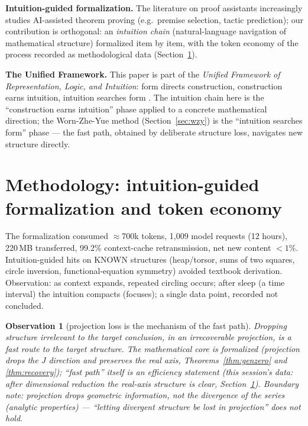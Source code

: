 \documentclass[11pt]{article}
\newtheorem{observation}{Observation}
\theoremstyle{remark}
\begin{document}
\textbf{Intuition-guided formalization.} The literature on proof assistants
increasingly studies AI-assisted theorem proving (e.g.\ premise selection,
tactic prediction); our contribution is orthogonal: an \emph{intuition chain}
(natural-language navigation of mathematical structure) formalized item by
item, with the token economy of the process recorded as methodological data
(Section~\ref{sec:methodology}).

\textbf{The Unified Framework.} This paper is part of the \emph{Unified
Framework of Representation, Logic, and Intuition}: form directs
construction, construction earns intuition, intuition searches form
\cite{uf-manifesto}. The intuition chain here is the ``construction earns
intuition'' phase applied to a concrete mathematical direction; the
Worn-Zhe-Yue method (Section~\ref{sec:wzy}) is the ``intuition searches
form'' phase --- the fast path, obtained by deliberate structure loss,
navigates new structure directly.

\section{Methodology: intuition-guided formalization and token economy}
\label{sec:methodology}

The formalization consumed $\approx$700k tokens, 1{,}009 model requests (12
hours), 220\,MB transferred, 99.2\% context-cache retransmission, net new
content $<1\%$. Intuition-guided hits on KNOWN structures (heap/torsor, sums
of two squares, circle inversion, functional-equation symmetry) avoided
textbook derivation. Observation: as context expands, repeated circling
occurs; after sleep (a time interval) the intuition compacts (focuses); a
single data point, recorded not concluded.

\begin{observation}[projection loss is the mechanism of the fast path]
\label{obs:fastpath}
Dropping structure irrelevant to the target conclusion, in an irrecoverable
projection, is a fast route to the target structure. The mathematical core is
formalized (projection drops the $J$ direction and preserves the real axis,
Theorems~\ref{thm:genzero} and \ref{thm:recovery}); ``fast path'' itself is an
efficiency statement (this session's data: after dimensional reduction the
real-axis structure is clear, Section~\ref{sec:methodology}). Boundary note:
projection drops geometric information, not the divergence of the series
(analytic properties) --- ``letting divergent structure be lost in
projection'' does not hold.
\end{observation}
\end{document}
